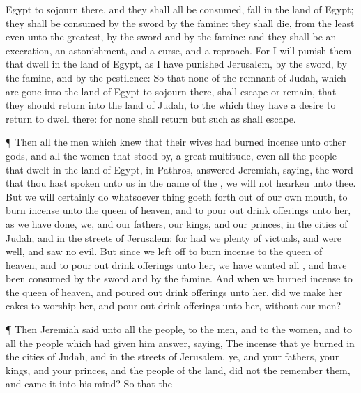 {Egypt to
sojourn there, and they shall all be
consumed,
{}
fall in the
land of
Egypt; they shall
{} be
consumed by the
sword
{} by the
famine: they shall
die, from the
least even unto the
greatest, by the
sword and by the
famine: and they shall be an
execration,
{} an
astonishment, and a
curse, and a
reproach.
For I will
punish them that
dwell in the
land of
Egypt, as I have
punished
Jerusalem, by the
sword, by the
famine, and by the
pestilence:
So that none of the
remnant of
Judah, which are
gone into the
land of
Egypt to
sojourn there, shall
escape or
remain, that they should
return into the
land of
Judah, to the which they
have a
desire to
return to
dwell there: for none shall
return but such as shall
escape.
\par }{\PP {}¶ Then all the
men which
knew that their
wives had burned
incense unto
other
gods, and all the
women that stood
by, a
great
multitude, even all the
people that
dwelt in the
land of
Egypt, in
Pathros,
answered
Jeremiah,
saying,
 the
word that thou hast
spoken unto us in the
name of the
{}, we will not
hearken unto thee.
But we will
certainly
do whatsoever
thing goeth
forth out of our own
mouth, to burn
incense unto the
queen of
heaven, and to pour
out drink
offerings unto her, as we have
done, we, and our
fathers, our
kings, and our
princes, in the
cities of
Judah, and in the
streets of
Jerusalem: for
{} had we
plenty of
victuals, and were
well, and
saw no
evil.
But since we left
off to burn
incense to the
queen of
heaven, and to pour
out drink
offerings unto her, we have
wanted all
{}, and have been
consumed by the
sword and by the
famine.
And when we burned
incense to the
queen of
heaven, and poured
out drink
offerings unto her, did we
make her
cakes to
worship her, and pour
out drink
offerings unto her,
without our
men?
\par }{\PP {}¶ Then
Jeremiah
said unto all the
people, to the
men, and to the
women, and to all the
people which had given him
{}
answer,
saying,
The
incense that ye
burned in the
cities of
Judah, and in the
streets of
Jerusalem, ye, and your
fathers, your
kings, and your
princes, and the
people of the
land, did not the
{}
remember them, and
came it
{} into his
mind?
So that the
}
